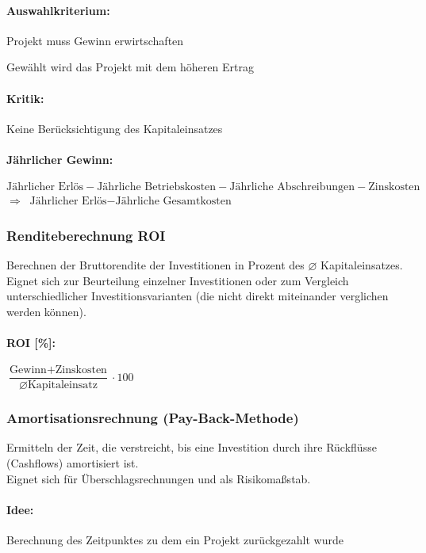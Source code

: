 \paragraph{Auswahlkriterium:}
\begin{compactitem}
	\item Projekt muss Gewinn erwirtschaften
	\item Gewählt wird das Projekt mit dem höheren Ertrag
\end{compactitem}

\paragraph{Kritik:} Keine Berücksichtigung des Kapitaleinsatzes

\paragraph{Jährlicher Gewinn:} $\text{Jährlicher Erlös} - \text{Jährliche Betriebskosten} - \text{Jährliche Abschreibungen} - \text{Zinskosten}$\\
$\Rightarrow$ $\text{Jährlicher Erlös} - \text{Jährliche Gesamtkosten}$

\clearpage
\subsubsection{Renditeberechnung ROI}
Berechnen der Bruttorendite der Investitionen in Prozent des $\varnothing$ Kapitaleinsatzes.\\
Eignet sich zur Beurteilung einzelner Investitionen oder zum Vergleich unterschiedlicher Investitionsvarianten (die nicht direkt miteinander verglichen werden können).

\paragraph{ROI [\%]:} $\dfrac{\text{Gewinn} + \text{Zinskosten}}{\varnothing \text{Kapitaleinsatz}}\cdot 100$

\clearpage
\subsubsection{Amortisationsrechnung (Pay-Back-Methode)}
Ermitteln der Zeit, die verstreicht, bis eine Investition durch ihre Rückflüsse (Cashflows) amortisiert ist.\\
Eignet sich für Überschlagsrechnungen und als Risikomaßstab.

\paragraph{Idee:} Berechnung des Zeitpunktes zu dem ein Projekt zurückgezahlt wurde

